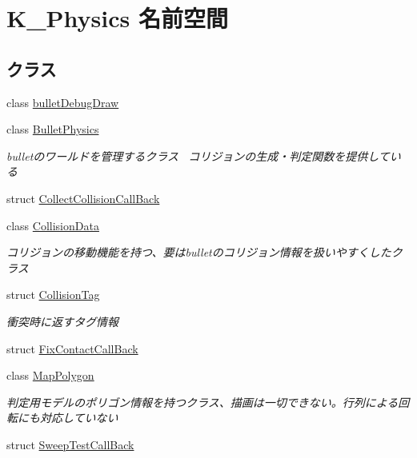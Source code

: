 \hypertarget{namespace_k___physics}{}\section{K\+\_\+\+Physics 名前空間}
\label{namespace_k___physics}
\subsection*{クラス}
\begin{DoxyCompactItemize}
\item 
class \mbox{\hyperlink{class_k___physics_1_1bullet_debug_draw}{bullet\+Debug\+Draw}}
\item 
class \mbox{\hyperlink{class_k___physics_1_1_bullet_physics}{Bullet\+Physics}}
\begin{DoxyCompactList}\small\item\em bulletのワールドを管理するクラス~\newline
コリジョンの生成・判定関数を提供している \end{DoxyCompactList}\item 
struct \mbox{\hyperlink{struct_k___physics_1_1_collect_collision_call_back}{Collect\+Collision\+Call\+Back}}
\item 
class \mbox{\hyperlink{class_k___physics_1_1_collision_data}{Collision\+Data}}
\begin{DoxyCompactList}\small\item\em コリジョンの移動機能を持つ、要はbulletのコリジョン情報を扱いやすくしたクラス \end{DoxyCompactList}\item 
struct \mbox{\hyperlink{struct_k___physics_1_1_collision_tag}{Collision\+Tag}}
\begin{DoxyCompactList}\small\item\em 衝突時に返すタグ情報 \end{DoxyCompactList}\item 
struct \mbox{\hyperlink{struct_k___physics_1_1_fix_contact_call_back}{Fix\+Contact\+Call\+Back}}
\item 
class \mbox{\hyperlink{class_k___physics_1_1_map_polygon}{Map\+Polygon}}
\begin{DoxyCompactList}\small\item\em 判定用モデルのポリゴン情報を持つクラス、描画は一切できない。行列による回転にも対応していない \end{DoxyCompactList}\item 
struct \mbox{\hyperlink{struct_k___physics_1_1_sweep_test_call_back}{Sweep\+Test\+Call\+Back}}
\end{DoxyCompactItemize}
